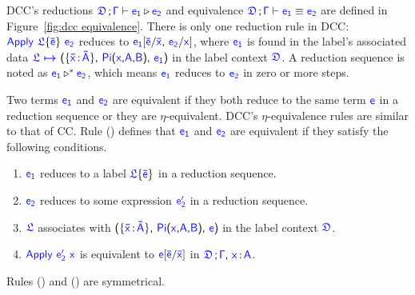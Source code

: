 DCC's reductions $\targetcon \vdash \target{e_1} \triangleright \target{e_2}$ and equivalence $\targetcon \vdash \target{e_1} \equiv \target{e_2}$ are defined in Figure~\ref{fig:dcc equivalence}. 
There is only one reduction rule in DCC: $\target{Apply\ } \targetlab{\flabel}{\bar{e}}\ \target{e_2}$
reduces to $\target{e_1}[\target{\bar{e}} \slash \target{\bar{x}} \sfcomma \target{e_2} \slash \target{x}]$, where $\target{e_1}$ is found in the label's associated data $\itemdef{\target{\flabel}}{\itemtype{\bar{x}}{\bar{A}}}{\targetpi{x}{A}{B}}{\target{e_1}}$ in the label context $\target{\fdef}$. A reduction sequence is noted as $\target{e_1} \triangleright^* \target{e_2}$, which means $\target{e_1}$ reduces to $\target{e_2}$ in zero or more steps.

Two terms $\target{e_1}$ and $\target{e_2}$ are equivalent if they both reduce to the same term $\target{e}$ in a reduction sequence or they are $\eta$-equivalent. DCC's $\eta$-equivalence rules are similar to that of CC. 
Rule () defines that $\target{e_1}$ and $\target{e_2}$ are equivalent if they satisfy the following conditions.
\begin{enumerate}
	\item  $\target{e_1}$ reduces to a label $\targetlab{\flabel}{\bar{e}}$ in a reduction sequence.
	\item  $\target{e_2}$ reduces to some expression $\target{e_2'}$ in a reduction sequence.
	\item  $\target{\flabel}$ associates with 
	$\textsf{(}\{\itemtype{\bar{x}}{\bar{A}}\}\textsf{,}\ \targetpi{x}{A}{B} \textsf{,}\ \target{e} \textsf{)}$ 
	in the label context $\target{\fdef}$.
	\item  $\targetapp{e_2'}{x}$ is equivalent to $\target{e}\targetsub{\bar{e}}{\bar{x}}$ in $\targetcon\sfcomma\itemtype{x}{A}$.
\end{enumerate}
Rules () and () are symmetrical.







